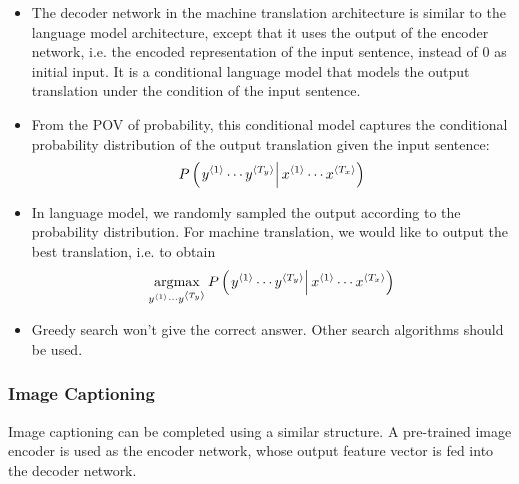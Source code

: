 \begin{itemize}
  \item The decoder network in the machine translation architecture is similar to the language model architecture, except that it uses the output of the encoder network, i.e. the encoded representation of the input sentence, instead of 0 as initial input. It is a conditional language model that models the output translation under the condition of the input sentence. 
  \item From the POV of probability, this conditional model captures the conditional probability distribution of the output translation given the input sentence:
  \[P\left(\left.y^{\left\langle 1\right\rangle}\cdots y^{\left\langle T_y\right\rangle}\right\vert x^{\left\langle 1\right\rangle}\cdots x^{\left\langle T_x\right\rangle}\right)\]
  \item In language model, we randomly sampled the output according to the probability distribution. For machine translation, we would like to output the best translation, i.e. to obtain
  \[\displaystyle\operatorname*{\arg\!\max}_{y^{\left\langle 1\right\rangle}\cdots y^{\left\langle T_y\right\rangle}} P\left(\left.y^{\left\langle 1\right\rangle}\cdots y^{\left\langle T_y\right\rangle}\right\vert x^{\left\langle 1\right\rangle}\cdots x^{\left\langle T_x\right\rangle}\right)\]
  \item Greedy search won't give the correct answer. Other search algorithms should be used.
\end{itemize}
\subsubsection{Image Captioning}
Image captioning can be completed using a similar structure. A pre-trained image encoder is used as the encoder network, whose output feature vector is fed into the decoder network. 
\begin{center}
\end{center}
